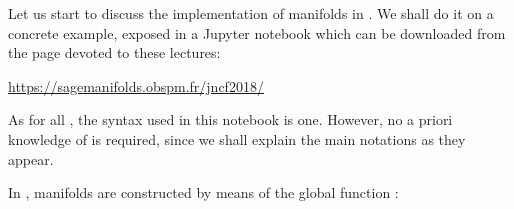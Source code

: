 Let us start to discuss the implementation of manifolds in \Sage{}. We shall
do it on a concrete example, exposed in a Jupyter notebook which can be downloaded
from the page devoted to these lectures:
\begin{center}
\url{https://sagemanifolds.obspm.fr/jncf2018/}
\end{center}
As for all \Sage{}, the syntax used in this notebook is  one. However, no
a priori knowledge of  is required, since we shall explain the
main notations as they appear.

In \Sage{}, manifolds are constructed by means of the global function :

\begin{NBin}
\end{NBin}

